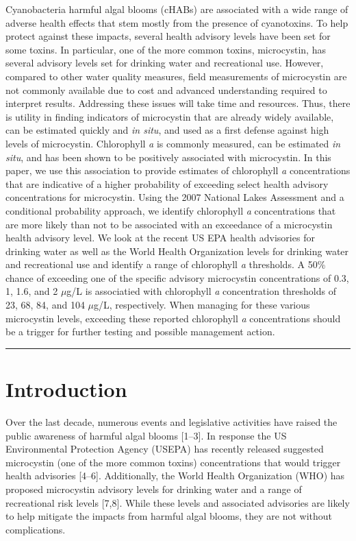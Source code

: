 \documentclass[11pt,]{article}
\begin{document}
Cyanobacteria harmful algal blooms (cHABs) are associated with a wide
range of adverse health effects that stem mostly from the presence of
cyanotoxins. To help protect against these impacts, several health
advisory levels have been set for some toxins. In particular, one of the
more common toxins, microcystin, has several advisory levels set for
drinking water and recreational use. However, compared to other water
quality measures, field measurements of microcystin are not commonly
available due to cost and advanced understanding required to interpret
results. Addressing these issues will take time and resources. Thus,
there is utility in finding indicators of microcystin that are already
widely available, can be estimated quickly and \emph{in situ}, and used
as a first defense against high levels of microcystin. Chlorophyll
\emph{a} is commonly measured, can be estimated \emph{in situ}, and has
been shown to be positively associated with microcystin. In this paper,
we use this association to provide estimates of chlorophyll \emph{a}
concentrations that are indicative of a higher probability of exceeding
select health advisory concentrations for microcystin. Using the 2007
National Lakes Assessment and a conditional probability approach, we
identify chlorophyll \emph{a} concentrations that are more likely than
not to be associated with an exceedance of a microcystin health advisory
level. We look at the recent US EPA health advisories for drinking water
as well as the World Health Organization levels for drinking water and
recreational use and identify a range of chlorophyll \emph{a}
thresholds. A 50\% chance of exceeding one of the specific advisory
microcystin concentrations of 0.3, 1, 1.6, and 2 \(\mu\)g/L is
associatied with chlorophyll \emph{a} concentration thresholds of 23,
68, 84, and 104 \(\mu\)g/L, respectively. When managing for these
various microcystin levels, exceeding these reported chlorophyll
\emph{a} concentrations should be a trigger for further testing and
possible management action.

\vspace{3mm}

\hrule

\doublespace

\section{Introduction}\label{introduction}

Over the last decade, numerous events and legislative activities have
raised the public awareness of harmful algal blooms {[}1--3{]}. In
response the US Environmental Protection Agency (USEPA) has recently
released suggested microcystin (one of the more common toxins)
concentrations that would trigger health advisories {[}4--6{]}.
Additionally, the World Health Organization (WHO) has proposed
microcystin advisory levels for drinking water and a range of
recreational risk levels {[}7,8{]}. While these levels and associated
advisories are likely to help mitigate the impacts from harmful algal
blooms, they are not without complications.
\end{document}
